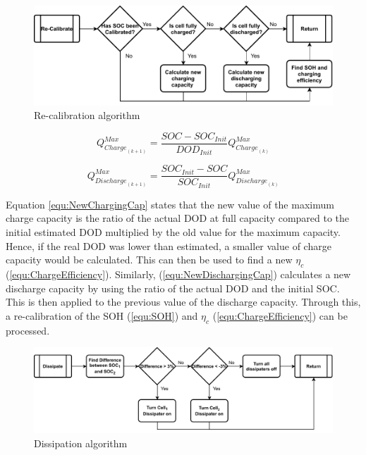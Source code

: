 \documentclass[10pt,twoside]{article}
\begin{document}
\begin{figure}[hbt]
    \centering
    \includegraphics[scale = 0.65]{Recalibration (1).pdf}
    \caption{Re-calibration algorithm}
    \label{fig:RecalibrationAlgorithm}
\end{figure}

\noindent\begin{minipage}{.49\linewidth}
\begin{equation}
    Q^{Max}_{{Charge}_{(k+1)}} = \frac{SOC - SOC_{Init}}{DOD_{Init}}Q^{Max}_{{Charge}_{(k)}}
    \label{equ:NewChargingCap}
\end{equation}
\end{minipage}
\begin{minipage}{.49\linewidth}
\begin{equation}
    Q^{Max}_{{Discharge}_{(k+1)}} = \frac{SOC_{Init} - SOC}{SOC_{Init}}Q^{Max}_{{Discharge}_{(k)}}
    \label{equ:NewDischargingCap}
\end{equation}
\end{minipage}

Equation \ref{equ:NewChargingCap} states that the new value of the maximum charge capacity is the ratio of the actual DOD at full capacity compared to the initial estimated DOD multiplied by the old value for the maximum capacity. Hence, if the real DOD was lower than estimated, a smaller value of charge capacity would be calculated. This can then be used to find a new $\eta_c$ (\ref{equ:ChargeEfficiency}). Similarly, (\ref{equ:NewDischargingCap}) calculates a new discharge capacity by using the ratio of the actual DOD and the initial SOC. This is then applied to the previous value of the discharge capacity. Through this, a re-calibration of the SOH (\ref{equ:SOH}) and $\eta_c$ (\ref{equ:ChargeEfficiency}) can be processed.
\begin{figure}[hbt!]
    \centering
    \includegraphics[scale = 0.65]{Dissipate (3).pdf}
    \caption{Dissipation algorithm}
    \label{fig:DisAlgorithm}
\end{figure}
\end{document}

